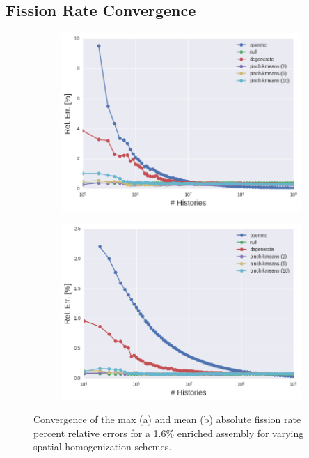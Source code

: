 \clearpage


\subsection{Fission Rate Convergence}
\label{subsec:chap11-fission-converge}

\clearpage

\begin{figure}[h!]
\centering
\begin{subfigure}{\textwidth}
  \centering
  \includegraphics[width=0.9\linewidth]{figures/results/assm-16/no-transform/evo-fission-max}
  \caption{}
  \label{fig:chap11-assm-1.6-fission-converge-max}
\end{subfigure}
\begin{subfigure}{\textwidth}
  \centering
  \includegraphics[width=0.9\linewidth]{figures/results/assm-16/no-transform/evo-fission-mean}
  \caption{}
  \label{fig:chap11-assm-1.6-fission-converge-mean}
\end{subfigure}
\vspace{2mm}
\caption[Fission rate covergence for a 1.6\% enriched assembly]{Convergence of the max (a) and mean (b) absolute fission rate percent relative errors for a 1.6\% enriched assembly for varying spatial homogenization schemes.}
\label{fig:chap11-assm-1.6-fission-converge}
\end{figure}

